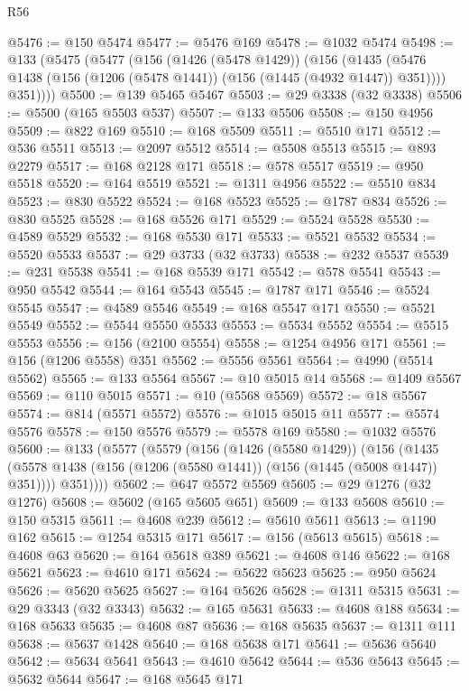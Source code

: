 \begin{lexlean}{R56}
\begin{coremodule}
@5476 := @150 @5474
@5477 := @5476 @169
@5478 := @1032 @5474
@5498 := @133
    (@5475
      (@5477
        (@156
          (@1426 (@5478 @1429))
          (@156
            (@1435 (@5476 @1438 (@156 (@1206 (@5478 @1441)) (@156 (@1445 (@4932 @1447)) @351))))
            @351))))
@5500 := @139 @5465 @5467
@5503 := @29 @3338 (@32 @3338)
@5506 := @5500 (@165 @5503 @537)
@5507 := @133 @5506
@5508 := @150 @4956
@5509 := @822 @169
@5510 := @168 @5509
@5511 := @5510 @171
@5512 := @536 @5511
@5513 := @2097 @5512
@5514 := @5508 @5513
@5515 := @893 @2279
@5517 := @168 @2128 @171
@5518 := @578 @5517
@5519 := @950 @5518
@5520 := @164 @5519
@5521 := @1311 @4956
@5522 := @5510 @834
@5523 := @830 @5522
@5524 := @168 @5523
@5525 := @1787 @834
@5526 := @830 @5525
@5528 := @168 @5526 @171
@5529 := @5524 @5528
@5530 := @4589 @5529
@5532 := @168 @5530 @171
@5533 := @5521 @5532
@5534 := @5520 @5533
@5537 := @29 @3733 (@32 @3733)
@5538 := @232 @5537
@5539 := @231 @5538
@5541 := @168 @5539 @171
@5542 := @578 @5541
@5543 := @950 @5542
@5544 := @164 @5543
@5545 := @1787 @171
@5546 := @5524 @5545
@5547 := @4589 @5546
@5549 := @168 @5547 @171
@5550 := @5521 @5549
@5552 := @5544 @5550 @5533
@5553 := @5534 @5552
@5554 := @5515 @5553
@5556 := @156 (@2100 @5554)
@5558 := @1254 @4956 @171
@5561 := @156 (@1206 @5558) @351
@5562 := @5556 @5561
@5564 := @4990 (@5514 @5562)
@5565 := @133 @5564
@5567 := @10 @5015 @14
@5568 := @1409 @5567
@5569 := @110 @5015
@5571 := @10 (@5568 @5569)
@5572 := @18 @5567
@5574 := @814 (@5571 @5572)
@5576 := @1015 @5015 @11
@5577 := @5574 @5576
@5578 := @150 @5576
@5579 := @5578 @169
@5580 := @1032 @5576
@5600 := @133
    (@5577
      (@5579
        (@156
          (@1426 (@5580 @1429))
          (@156
            (@1435 (@5578 @1438 (@156 (@1206 (@5580 @1441)) (@156 (@1445 (@5008 @1447)) @351))))
            @351))))
@5602 := @647 @5572 @5569
@5605 := @29 @1276 (@32 @1276)
@5608 := @5602 (@165 @5605 @651)
@5609 := @133 @5608
@5610 := @150 @5315
@5611 := @4608 @239
@5612 := @5610 @5611
@5613 := @1190 @162
@5615 := @1254 @5315 @171
@5617 := @156 (@5613 @5615)
@5618 := @4608 @63
@5620 := @164 @5618 @389
@5621 := @4608 @146
@5622 := @168 @5621
@5623 := @4610 @171
@5624 := @5622 @5623
@5625 := @950 @5624
@5626 := @5620 @5625
@5627 := @164 @5626
@5628 := @1311 @5315
@5631 := @29 @3343 (@32 @3343)
@5632 := @165 @5631
@5633 := @4608 @188
@5634 := @168 @5633
@5635 := @4608 @87
@5636 := @168 @5635
@5637 := @1311 @111
@5638 := @5637 @1428
@5640 := @168 @5638 @171
@5641 := @5636 @5640
@5642 := @5634 @5641
@5643 := @4610 @5642
@5644 := @536 @5643
@5645 := @5632 @5644
@5647 := @168 @5645 @171

\end{coremodule}
\end{lexlean}
